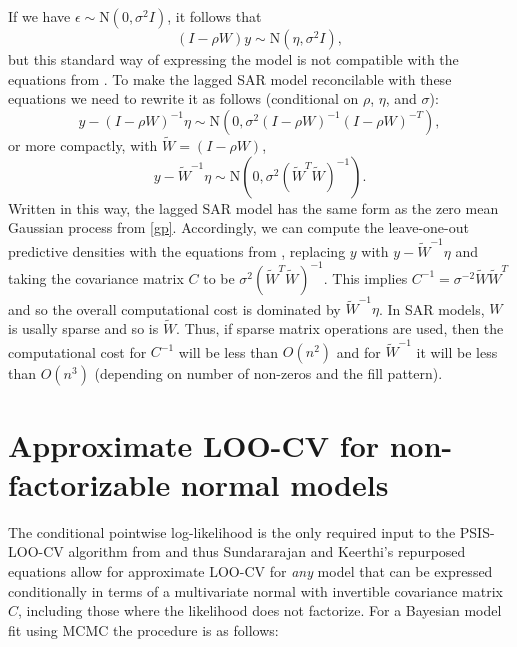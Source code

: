 \documentclass[11pt]{article}
\begin{document}
If we have $\epsilon \sim \mathrm{N}(0, \sigma^2 I)$, it follows that 
%
\begin{equation}
\label{lagsar}
(I - \rho W) y \sim \mathrm{N}(\eta, \sigma^2 I),
\end{equation}
%
but this standard way of expressing the model is not compatible with the equations 
from \cite{sundararajan2001}. To make the lagged SAR model reconcilable with 
these equations we need to rewrite it as follows (conditional on 
$\rho$, $\eta$, and $\sigma$):
%
\begin{equation}
y - (I - \rho W)^{-1} \eta \sim \mathrm{N}\left(0, \sigma^2 (I - \rho W)^{-1} (I - \rho W)^{-T} \right),
\end{equation}
%
or more compactly, with $\widetilde{W} = (I - \rho W)$, 
%
\begin{equation}
y - \widetilde{W}^{-1} \eta \sim \mathrm{N}\left(0, \sigma^2  (\widetilde{W}^T \widetilde{W})^{-1} \right).
\end{equation}
%
Written in this way, the lagged SAR model has the same form as the zero mean Gaussian process from 
\eqref{gp}. Accordingly, we can compute the leave-one-out predictive densities with the equations from 
\cite{sundararajan2001}, replacing $y$ with $y - \widetilde{W}^{-1} \eta$ and taking the covariance
matrix $C$ to be $\sigma^2  (\widetilde{W}^T \widetilde{W})^{-1}$. This implies $C^{-1}=\sigma^{-2}\widetilde{W} \widetilde{W}^T$ and so the overall computational cost is dominated by $\widetilde{W}^{-1} \eta$. In SAR models, $W$ is usally sparse and so is $\widetilde{W}$. Thus, if sparse matrix operations are used, then the computational cost for $C^{-1}$ will be less than $O(n^2)$ and for $\widetilde{W}^{-1}$ it will be less than $O(n^3)$ (depending on number of non-zeros and the fill pattern).

\section{Approximate LOO-CV for non-factorizable normal models}
\label{sec-approx}

The conditional pointwise log-likelihood is the only required input to the
PSIS-LOO-CV algorithm from \cite{vehtari2017loo} and thus Sundararajan and
Keerthi's repurposed equations allow for approximate LOO-CV for \emph{any} model
that can be expressed conditionally in terms of a multivariate normal with
invertible covariance matrix $C$, including those where the likelihood does not
factorize. For a Bayesian model fit using MCMC the procedure is as follows:
\end{document}
